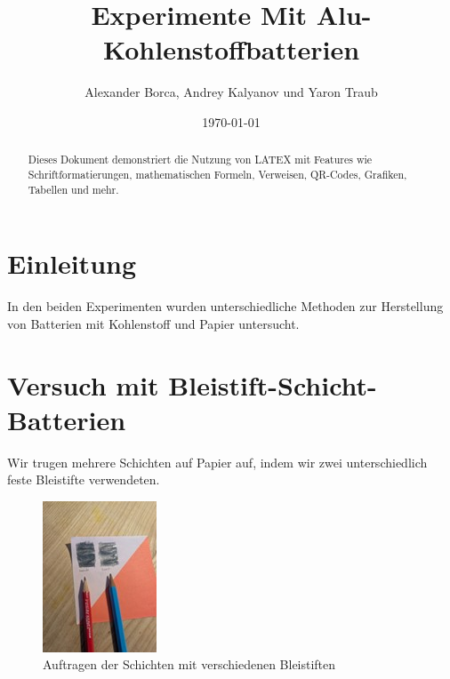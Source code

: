\documentclass[ngerman, a4paper,12pt]{article}
\begin{document}
\title{Experimente Mit Alu- Kohlenstoffbatterien}
\author{Alexander Borca, Andrey Kalyanov und Yaron Traub}
\date{\today}
\maketitle

\begin{abstract}
	\noindent Dieses Dokument demonstriert die Nutzung von LATEX mit Features wie Schriftformatierungen, mathematischen Formeln, Verweisen, QR-Codes, Grafiken, Tabellen und mehr.
\end{abstract}

\tableofcontents
\newpage

\listoffigures
\newpage

\section{Einleitung}
In den beiden Experimenten wurden unterschiedliche Methoden zur Herstellung von Batterien mit Kohlenstoff und Papier untersucht.

\section{Versuch mit Bleistift-Schicht-Batterien}

\noindent Wir trugen mehrere Schichten auf Papier auf, indem wir zwei unterschiedlich feste Bleistifte verwendeten.
\begin{figure}[htbp]
	\centering
	\includegraphics[height=0.3\textheight]{Bild1.jpg}
	\caption{Auftragen der Schichten mit verschiedenen Bleistiften}\label{fig:bild1}
\end{figure}
\newpage
\end{document}
